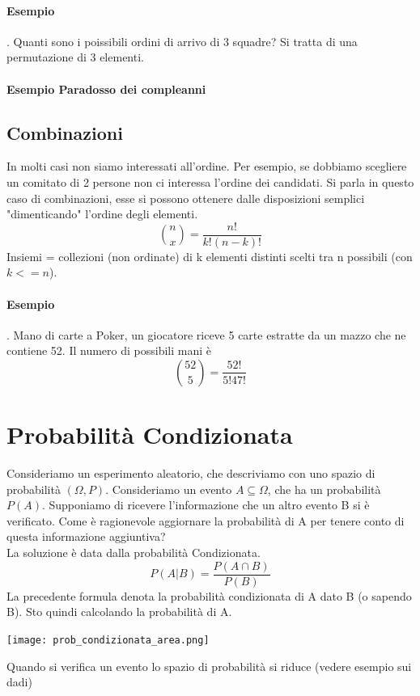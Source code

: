 \documentclass[12pt, a4paper, openany]{book}
\begin{document}
\paragraph{Esempio}. Quanti sono i poissibili ordini di arrivo di 3 squadre?
Si tratta di una permutazione di 3 elementi.
\paragraph{Esempio Paradosso dei compleanni}

\subsection{Combinazioni}
In molti casi non siamo interessati all'ordine. 
Per esempio, se dobbiamo scegliere un comitato di 2 persone non ci interessa l'ordine 
dei candidati.
Si parla in questo caso di combinazioni, esse si possono ottenere dalle disposizioni semplici
"dimenticando" l'ordine degli elementi.
\begin{equation}
    {n \choose x} = \frac{n!}{k!(n-k)!}
\end{equation}
Insiemi = collezioni (non ordinate) di k elementi distinti scelti tra n possibili (con $k <= n$).
\paragraph{Esempio}. Mano di carte a Poker, un giocatore riceve 5 carte estratte da un mazzo che
ne contiene 52. Il numero di possibili mani è
\begin{equation}
    {52 \choose 5} = \frac{52!}{5!47!}
\end{equation} 

\section{Probabilità Condizionata}
Consideriamo un esperimento aleatorio, che descriviamo con uno spazio di probabilità $(\Omega, P)$.
Consideriamo un evento $A \subseteq \Omega$, che ha un probabilità $P(A)$.
Supponiamo di ricevere l'informazione che un altro evento B si è verificato.
Come è ragionevole aggiornare la probabilità di A per tenere conto di questa informazione aggiuntiva?
\\La soluzione è data dalla probabilità Condizionata.
\begin{equation}
    P(A|B) = \frac{P(A \cap B)}{P(B)}
\end{equation}
La precedente formula denota la probabilità condizionata di A dato B (o sapendo B).
Sto quindi calcolando la probabilità di A.
\begin{center}
    \texttt{[image: prob\_condizionata\_area.png]}    
\end{center}
Quando si verifica un evento lo spazio di probabilità si riduce (vedere esempio sui dadi)
\end{document}
